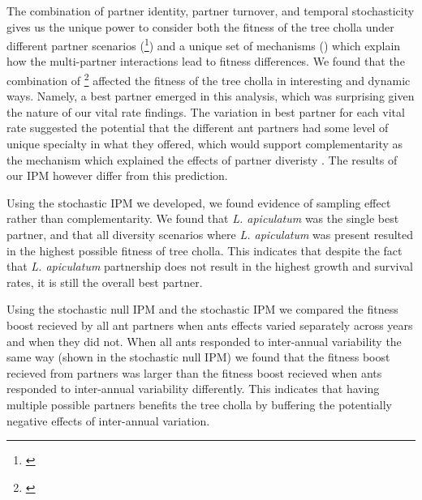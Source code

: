 \documentclass[11pt]{article}
\newcommand{\tom}[2]{{\color{red}{#1}}\footnote{\textit{\color{red}{#2}}}}
\begin{document}
The combination of partner identity, partner turnover, and temporal stochasticity gives us the unique power to consider both the fitness of the tree cholla under different partner scenarios (\tom{as some have done before \cite{Palmer2010}}{There is more than just the Palmer pape. Be sure that you are comprehensive in your use of the literaure, include non-ant-plant studies,}) and a unique set of mechanisms (\cite{Batstone2018}) which explain how the multi-partner interactions lead to fitness differences. 
We found that the combination of \tom{accurate partner transitions with partner identity}{Not sure what this means.} affected the fitness of the tree cholla in interesting and dynamic ways. 
Namely, a best partner emerged in this analysis, which was surprising given the nature of our vital rate findings. 
The variation in best partner for each vital rate suggested the potential that the different ant partners had some level of unique specialty in what they offered, which would support complementarity as the mechanism which explained the effects of partner diveristy \cite{Stachowicz2005, Stanton2003}. 
The results of our IPM however differ from this prediction. 

Using the stochastic IPM we developed, we found evidence of sampling effect rather than complementarity.
We found that \textit{L. apiculatum} was the single best partner, and that all diversity scenarios where \textit{L. apiculatum} was present resulted in the highest possible fitness of tree cholla. 
This indicates that despite the fact that \textit{L. apiculatum} partnership does not result in the highest growth and survival rates, it is still the overall best partner. 

Using the stochastic null IPM and the stochastic IPM we compared the fitness boost recieved by all ant partners when ants effects varied separately across years and when they did not. 
When all ants responded to inter-annual variability the same way (shown in the stochastic null IPM) we found that the fitness boost recieved from partners was larger than the fitness boost recieved when ants responded to inter-annual variability differently.
This indicates that having multiple possible partners benefits the tree cholla by buffering the potentially negative effects of inter-annual variation. 
\end{document}
